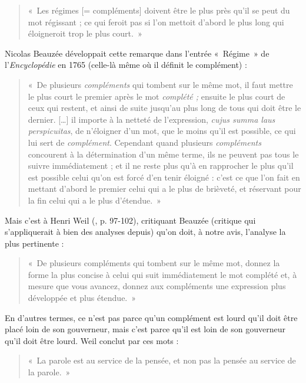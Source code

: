 \begin{quote}
    «~Les régimes [= compléments] doivent être le plus près qu’il se peut du mot régissant ; ce qui feroit pas si l’on mettoit d’abord le plus long qui éloigneroit trop le plus court.~»
\end{quote}
Nicolas Beauzée développait cette remarque dans l’entrée «~Régime~» de l’\textit{Encyclopédie} en 1765 (celle-là même où il définit le complément) :
\begin{quote}
    «~De plusieurs \textit{compléments} qui tombent sur le même mot, il faut mettre le plus court le premier après le mot \textit{complété ;} ensuite le plus court de ceux qui restent, et ainsi de suite jusqu’au plus long de tous qui doit être le dernier. […] il importe à la netteté de l’expression, \textit{\textit{cujus summa laus perspicuitas}}, de n’éloigner d’un mot, que le moins qu’il est possible, ce qui lui sert de \textit{complément}. Cependant quand plusieurs \textit{compléments} concourent à la détermination d’un même terme, ils ne peuvent pas tous le suivre immédiatement ; et il ne reste plus qu’à en rapprocher le plus qu’il est possible celui qu’on est forcé d’en tenir éloigné : c’est ce que l’on fait en mettant d’abord le premier celui qui a le plus de brièveté, et réservant pour la fin celui qui a le plus d’étendue.~»
\end{quote}
Mais c’est à Henri Weil (\citeyear{Weil1844}, p. 97-102), critiquant Beauzée (critique qui s’appliquerait à bien des analyses depuis) qu’on doit, à notre avis, l’analyse la plus pertinente :
\begin{quote}
    «~De plusieurs compléments qui tombent sur le même mot, donnez la forme la plus concise à celui qui suit immédiatement le mot complété et, à mesure que vous avancez, donnez aux compléments une expression plus développée et plus étendue.~»
\end{quote}
En d’autres termes, ce n’est pas parce qu’un complément est lourd qu’il doit être placé loin de son gouverneur, mais c’est parce qu’il est loin de son gouverneur qu’il doit être lourd. Weil conclut par ces mots :
\begin{quote}
    «~La parole est au service de la pensée, et non pas la pensée au service de la parole.~»
\end{quote}
